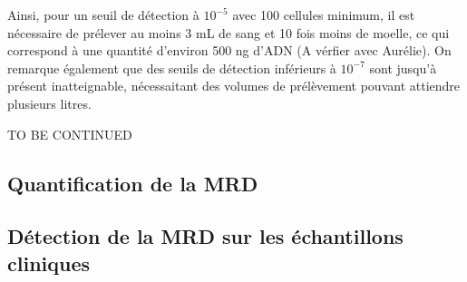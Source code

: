 Ainsi, pour un seuil de détection à $10^{-5}$ avec 100 cellules minimum, il est nécessaire de prélever au moins 3 mL de sang 
et 10 fois moins de moelle, ce qui correspond à une quantité d'environ 500 ng d'ADN (A vérfier avec Aurélie). On remarque également 
que des seuils de détection inférieurs à $10^{-7}$ sont jusqu'à présent inatteignable, nécessaitant des volumes de prélèvement pouvant 
attiendre plusieurs litres.

TO BE CONTINUED

\subsection{Quantification de la MRD}

\subsection{Détection de la MRD sur les échantillons cliniques}